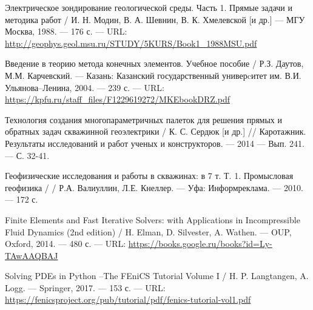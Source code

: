\begingroup 
\renewcommand{\section}[2]{\anonsection{Библиографический список}}
\begin{thebibliography}{00}

    Электрическое зондирование геологической среды. Часть 1. Прямые задачи и методика работ /
    И. Н. Модин, В. А. Шевнин, В. К. Хмелевской [и др.]
    --- МГУ Москва, 1988.
    --- 176 с.
    --- URL: \url{http://geophys.geol.msu.ru/STUDY/5KURS/Book1_1988MSU.pdf}

    Введение в теорию метода конечных элементов. Учебное пособие /
    Р.З. Даутов, М.М. Карчевский.
    — Казань: Казанский государственный универcитет им. В.И. Ульянова–Ленина, 2004.
    — 239 с.
    --- URL: \url{https://kpfu.ru/staff_files/F1229619272/MKEbookDRZ.pdf}

    Технология создания многопараметричных
    палеток для решения прямых и обратных задач
    скважинной геоэлектрики /
    К. С. Сердюк [и др.] //
    Каротажник. Результаты исследований и работ ученых и конструкторов.
    --- 2014
    --- Вып. 241.
    --- С. 32-41.

    Геофизические исследования и работы в скважинах: в 7 т. Т. 1.
    Промысловая геофизика /
    / Р.А. Валиуллин, Л.Е. Кнеллер.
    --- Уфа: Информреклама.
    --- 2010.
    --- 172 с.
   
    Finite Elements and Fast Iterative Solvers: with Applications in Incompressible Fluid Dynamics (2nd edition) /
    H. Elman, D. Silvester, A. Wathen.
    --- OUP, Oxford, 2014. 
    --- 480 с.
    --- URL: \url{https://books.google.ru/books?id=Ly-TAwAAQBAJ}

    Solving PDEs in Python --The FEniCS Tutorial Volume I /
    H. P. Langtangen, A. Logg.
    --- Springer, 2017.
    --- 153 с.
    --- URL: \url{https://fenicsproject.org/pub/tutorial/pdf/fenics-tutorial-vol1.pdf}

\end{thebibliography}
\endgroup

\clearpage

